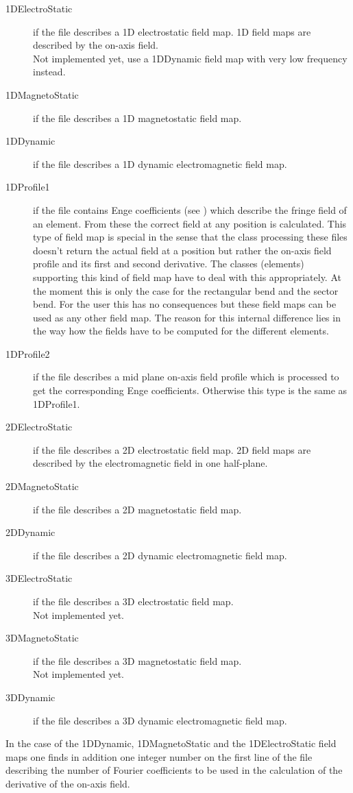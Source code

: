 \begin{description}
\item[1DElectroStatic]
if the file describes a 1D electrostatic field map. 1D field maps are described by the on-axis field.\\
Not implemented yet, use a 1DDynamic field map with very low frequency instead.
\item[1DMagnetoStatic]
if the file describes a 1D magnetostatic field map.
\item[1DDynamic]
if the file describes a 1D dynamic electromagnetic field map.
\item[1DProfile1]
if the file contains Enge coefficients (see \cite{enge}) which describe the fringe field of an element. From these the correct field at any position is calculated. This type of field map is special in the sense that the class processing these files doesn't return the actual field at a position but rather the on-axis field profile and its first and second derivative. The classes (elements) supporting this kind of field map have to deal with this appropriately. At the moment this is only the case for the rectangular bend and the sector bend. For the user this has no consequences but these field maps can be used as any other field map. The reason for this internal difference lies in the way how the fields have to be computed for the different elements.
\item[1DProfile2]
if the file describes a mid plane on-axis field profile which is processed to get the corresponding Enge coefficients. Otherwise this type is the same as 1DProfile1. 
\item[2DElectroStatic]
if the file describes a 2D electrostatic field map. 2D field maps are described by the electromagnetic field in one half-plane.
\item[2DMagnetoStatic]
if the file describes a 2D magnetostatic field map.
\item[2DDynamic]
if the file describes a 2D dynamic electromagnetic field map.
\item[3DElectroStatic]
if the file describes a 3D electrostatic field map.\\
Not implemented yet.
\item[3DMagnetoStatic]
if the file describes a 3D magnetostatic field map.\\
Not implemented yet.
\item[3DDynamic]
if the file describes a 3D dynamic electromagnetic field map.
\end{description}
In the case of the 1DDynamic, 1DMagnetoStatic and the 1DElectroStatic field maps one finds in addition one integer number on the first line of the file describing the number of Fourier coefficients to be used in the calculation of the derivative of the on-axis field. 

